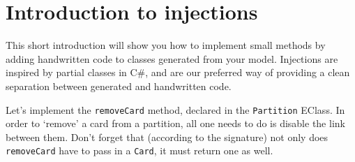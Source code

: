 \newpage
\section{Introduction to injections}
\genHeader

This short introduction will show you how to implement small methods by adding handwritten code to classes generated from your model. Injections are inspired by
partial classes in C\#, and are our preferred way of providing a clean separation between generated and handwritten code. 

Let's implement the \texttt{removeCard} method, declared in the \texttt{Partition} EClass. In order to `remove' a card from a partition, all one needs to do is
disable the link between them. Don't forget that (according to the signature) not only does \texttt{removeCard} have to pass in a \texttt{Card}, it must return
one as well.

